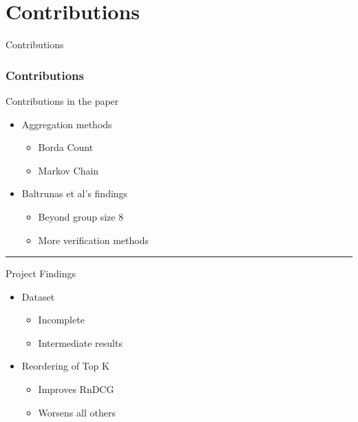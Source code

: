 \section{Contributions}
\begin{frame}
     \begin{center}
     	\huge Contributions
     \end{center}
\end{frame}

\begin{frame}
\frametitle{Contributions}
Contributions in the paper
\begin{itemize}
	\item Aggregation methods
	\begin{itemize}
		\item Borda Count
		\item Markov Chain
	\end{itemize}
	\item Baltrunas et al's findings
	\begin{itemize}
		\item Beyond group size 8
		\item More verification methods
	\end{itemize}
\end{itemize}
\hrule \smallskip
Project Findings
\begin{itemize}
	\item Dataset
	\begin{itemize}
		\item Incomplete
		\item Intermediate results
	\end{itemize}
	\item Reordering of Top K
	\begin{itemize}
		\item Improves RnDCG
		\item Worsens all others
	\end{itemize}
\end{itemize}
\end{frame}